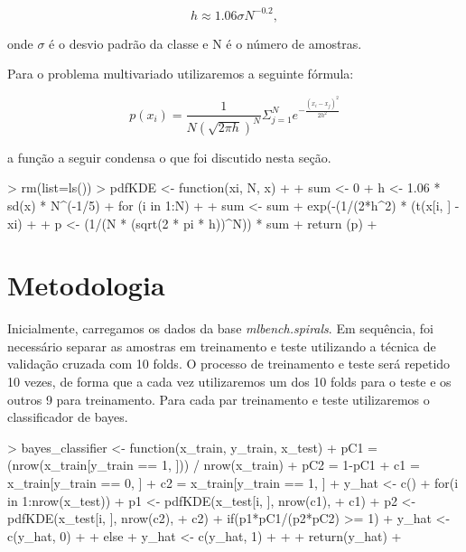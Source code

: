 \documentclass[12pt]{article}
\begin{document}
  \begin{equation}
  h \approx 1.06\sigma N^{-0.2},
  \end{equation}
  
  \par onde $\sigma$ é o desvio padrão da classe e N é o número de amostras.
  
  \par Para o problema multivariado  utilizaremos a seguinte fórmula:
  
  \begin{equation}
  p(x_i) = \frac{1}{N(\sqrt{2\pi h})^N}\Sigma_{j = 1}^{N}e^{-\frac{(x_i - x_j)^2}{2h^2}}
  \label{px}
  \end{equation}
  
  \par a função a seguir condensa o que foi discutido nesta seção.
\begin{Schunk}
\begin{Sinput}
> rm(list=ls())
> pdfKDE <- function(xi, N, x)
+ {
+   sum <- 0
+   h <- 1.06 * sd(x) * N^(-1/5)
+   for (i in 1:N)
+   {
+     sum <- sum + exp(-(1/(2*h^2) * (t(x[i, ] - xi) %
+   }
+   p <- (1/(N * (sqrt(2 * pi * h))^N)) * sum
+   return (p)
+ }
\end{Sinput}
\end{Schunk}

\section{Metodologia}

  \par Inicialmente, carregamos os dados da base \textit{mlbench.spirals}. Em sequência, foi necessário separar as amostras em treinamento e teste utilizando a técnica de validação cruzada com 10 folds. O processo de treinamento e teste será repetido 10 vezes, de forma que a cada vez utilizaremos um dos 10 folds para o teste e os outros 9 para treinamento. Para cada par treinamento e teste utilizaremos o classificador de bayes.

\begin{Schunk}
\begin{Sinput}
> bayes_classifier <- function(x_train, y_train, x_test){
+   pC1 = (nrow(x_train[y_train == 1, ])) / nrow(x_train)
+   pC2 = 1-pC1
+   c1 = x_train[y_train == 0, ]
+   c2 = x_train[y_train == 1, ]
+   y_hat <- c()
+   for(i in 1:nrow(x_test)){
+     p1 <- pdfKDE(x_test[i, ], nrow(c1),
+                  c1)
+     p2 <- pdfKDE(x_test[i, ], nrow(c2),
+                  c2)
+     if(p1*pC1/(p2*pC2) >= 1){
+       y_hat <-c(y_hat, 0)
+     }
+     else{
+       y_hat <- c(y_hat, 1)
+     }
+   }
+   return(y_hat)
+ }
\end{Sinput}
\end{Schunk}
\end{document}
